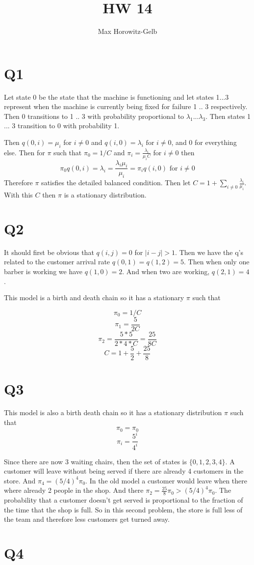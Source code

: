 \documentclass{article}
\title{HW 14}
\author{Max Horowitz-Gelb}
\begin{document}
\maketitle
\section*{Q1}
Let state 0 be the state that the machine is functioning and let states 1...3 represent when the machine is currently being fixed for failure 1 .. 3 respectively. Then 0 transitions to 1 .. 3 with probability proportional to $\lambda_1 ... \lambda_3$. Then states 1 ... 3 transition to 0 with probability 1. 

Then $q(0, i) = \mu_i$ for $i \neq 0$ and $q(i, 0) = \lambda_i \text{ for } i \neq 0$, and 0 for everything else. Then for $\pi$ such that $\pi_0 = 1 / C$ and $\pi_i = \frac{\lambda_i}{\mu_i C} $ for $i \neq 0$ then 
$$
\pi_0 q(0,i) = \lambda_i = \frac{\lambda_i \mu_i}{\mu_i} = \pi_i q(i,0) \text{ for } i \neq 0
$$
Therefore $\pi$ satisfies the detailed balanced condition. Then let $C = 1 + \sum_{i \neq 0} \frac{\lambda_i}{\mu_i}$. With this $C$ then $\pi$ is a stationary distribution. 


\section*{Q2}
It should first be obvious that $q(i,j) = 0$ for $\lvert i - j \rvert > 1$.
Then we have the q's related to the customer arrival rate
$q(0,1) = q(1,2) = 5. $
Then when only one barber is working we have
$q(1,0) = 2$. And when two are working, $q(2,1) = 4$. 

This model is a birth and death chain so it has a stationary  $\pi$ such that

$$\pi_0 = 1 / C$$
$$\pi_1 = \frac{5}{2C}$$
$$\pi_2 = \frac{5*5}{2*4*C} = \frac{25}{8C}$$
$$C = 1 + \frac{5}{2} + \frac{25}{8}$$

\section*{Q3}
This model is also a birth death chain so it has a stationary distribution $\pi$ such that
$$
\pi_0 = \pi_0
$$
$$
\pi_i = \frac{5^i}{4^i}
$$

Since there are now 3 waiting chairs, then the set of states is $\{0, 1, 2,3,4\}$. 
A customer will leave without being served if there are already 4 customers in the store. 
And $\pi_4 = (5/4)^4 \pi_0$. In the old model a customer would leave when there where already 2 people in the shop. And there $\pi_2 = \frac{25}{8} \pi_0 > (5/4)^4 \pi_0$. The probability that a customer doesn't get served is proportional to the fraction of the time that the shop is full. So in this second problem, the store is full less of the team and therefore less customers get turned away.

\section*{Q4}
\end{document}
